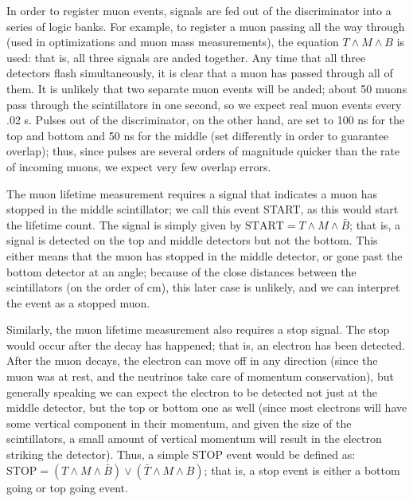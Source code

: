 In order to register muon events, signals are fed out of the discriminator into a series of logic banks. For example, to register a muon passing all the way through (used in optimizations and muon mass measurements), the equation $T \wedge M \wedge B$ is used: that is, all three signals are anded together. Any time that all three detectors flash simultaneously, it is clear that a muon has passed through all of them. It is unlikely that two separate muon events will be anded; about 50 muons pass through the scintillators in one second, so we expect real muon events every .02 s. Pulses out of the discriminator, on the other hand, are set to 100 ns for the top and bottom and 50 ns for the middle (set differently in order to guarantee overlap); thus, since pulses are several orders of magnitude quicker than the rate of incoming muons, we expect very few overlap errors.

The muon lifetime measurement requires a signal that indicates a muon has stopped in the middle scintillator; we call this event START, as this would start the lifetime count. The signal is simply given by $\mathrm{START} = T \wedge M \wedge \bar{B}$; that is, a signal is detected on the top and middle detectors but not the bottom. This either means that the muon has stopped in the middle detector, or gone past the bottom detector at an angle; because of the close distances between the scintillators (on the order of cm), this later case is unlikely, and we can interpret the event as a stopped muon.


Similarly, the muon lifetime measurement also requires a stop signal. The stop would occur after the decay has happened; that is, an electron has been detected. After the muon decays, the electron can move off in any direction (since the muon was at rest, and the neutrinos take care of momentum conservation), but generally speaking we can expect the electron to be detected not just at the middle detector, but the top or bottom one as well (since most electrons will have some vertical component in their momentum, and given the size of the scintillators, a small amount of vertical momentum will result in the electron striking the detector). Thus, a simple STOP event would be defined as: $\mathrm{STOP} = (T \wedge M \wedge \bar{B}) \vee (\bar{T} \wedge M \wedge B)$; that is, a stop event is either a bottom going or top going event.


